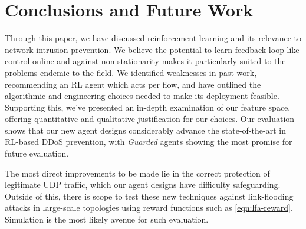 \documentclass[10pt, times, comsoc]{IEEEtran}
\begin{document}
\section{Conclusions and Future Work}
Through this paper, we have discussed reinforcement learning and its relevance to network intrusion prevention.
We believe the potential to learn feedback loop-like control online and against non-stationarity makes it particularly suited to the problems endemic to the field.
We identified weaknesses in past work, recommending an RL agent which acts per flow, and have outlined the algorithmic and engineering choices needed to make its deployment feasible.
Supporting this, we've presented an in-depth examination of our feature space, offering quantitative and qualitative justification for our choices.
Our evaluation shows that our new agent designs considerably advance the state-of-the-art in RL-based DDoS prevention, with \emph{Guarded} agents showing the most promise for future evaluation.

The most direct improvements to be made lie in the correct protection of legitimate UDP traffic, which our agent designs have difficulty safeguarding.
Outside of this, there is scope to test these new techniques against link-flooding attacks in large-scale topologies using reward functions such as \cref{eqn:lfa-reward}.
Simulation is the most likely avenue for such evaluation.


\end{document}
